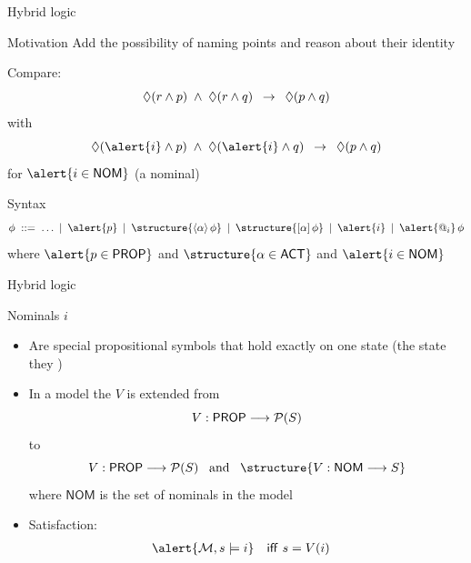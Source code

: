 \documentclass[aspectratio=169]{beamer}
\begin{document}
\begin{slide}{Hybrid logic}\label{s:46}
\small

\begin{block}{Motivation}
Add the possibility of \alert{naming} points and reason about their \alert{identity}

\vspace{0.5cm}
Compare:
\begin{equation*}
\Diamond (r \land p)\; \land\; \Diamond (r \land q)\; \; \mathbin{\rightarrow}\; \; \Diamond (p \land q)
\end{equation*}
with
\begin{equation*}
\eventual (\alert{i} \land p)\; \land\; \eventual (\alert{i} \land q)\; \; \impp\; \; \eventual (p \land q)
\end{equation*}
for $\alert{i \in \mathsf{NOM}}$ (a \alert{nominal})
\end{block}

\begin{block}{Syntax}
  \begin{equation*}
\phi\; ::=\;
    \ldots \:\mid\:
    \alert{p} \: \mid\: 
    \structure{\evm{\alpha}{\phi}} \:  \mid\:
    \structure{\alm{\alpha}{\phi}} \:  \mid\:
    \alert{i} \:  \mid\:
    \alert{@_i}\,\phi
\end{equation*}
where $\alert{p \in \mathsf{PROP}}$ and $\structure{\alpha \in \mathsf{ACT}}$ and $\alert{i \in \mathsf{NOM}}$
\end{block}
\end{slide}

\begin{slide}{Hybrid logic}\label{s:47}
\small

\begin{block}{Nominals $i$}
\begin{itemize}
\item Are special propositional symbols that hold exactly on one state (the state they )
\item  In a model the  $V$ is extended from 
$$ V: \mathsf{PROP} \longrightarrow {\cal P}(S) $$
to
$$ \fdec{V}{\mathsf{PROP}}{\pow{(S)}} \; \; \; \text{and}\; \; \;  \structure{\fdec{V}{\mathsf{NOM}}{S} }$$
where $\mathsf{NOM}$ is the set of nominals in the model
\item Satisfaction:
\begin{align*}
\alert{\ger{M}, s  \models  i} &&  \text{\textsf{iff} }  & s = V(i)
\end{align*}
\end{itemize}
\end{block}


\end{slide}
\end{document}
